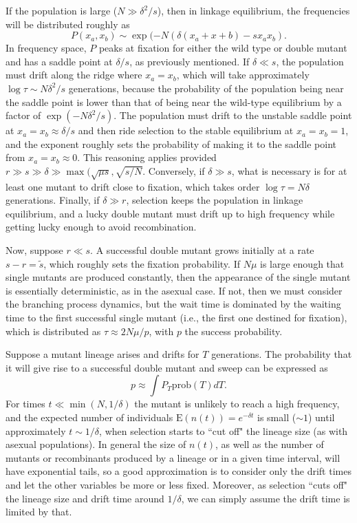\documentclass[10pt]{revtex4}
\begin{document}
If the population is large ($N \gg \delta^2/s$), then in linkage equilibrium, the frequencies will be distributed roughly as
\begin{equation}
P(x_a,x_b) \sim \exp(-N(\delta(x_a+x+b) - sx_ax_b).
\end{equation}
In frequency space, $P$ peaks at fixation for either the wild type or double mutant and has a saddle point at $\delta/s$, as previously mentioned.
If $\delta \ll s$, the population must drift along the ridge where $x_a = x_b$, which will take approximately $\log \tau \sim N\delta^2/s$ generations, because the probability of the population being near the saddle point is lower than that of being near the wild-type equilibrium by a factor of $\exp (-N\delta^2/s)$. 
The population must drift to the unstable saddle point at $x_a = x_b \approx \delta/s$ and then ride selection to the stable equilibrium at $x_a = x_b = 1$, and the exponent roughly sets the probability of making it to the saddle point from $x_a = x_b \approx 0$.
This reasoning applies provided $r \gg s \gg \delta \gg \max (\sqrt{\mu s},\sqrt{s/N}$.
Conversely, if $\delta \gg s$, what is necessary is for at least one mutant to drift close to fixation, which takes order $\log \tau = N\delta$ generations.
Finally, if $\delta \gg r$, selection keeps the population in linkage equilibrium, and a lucky double mutant must drift up to high frequency while getting lucky enough to avoid recombination.

Now, suppose $r \ll s$.
A successful double mutant grows initially at a rate $s - r = \tilde{s}$, which roughly sets the fixation probability.
If $N\mu$ is large enough that single mutants are produced constantly, then the appearance of the single mutant is essentially deterministic, as in the asexual case.
If not, then we must consider the branching process dynamics, but the wait time is dominated by the waiting time to the first successful single mutant (i.e., the first one destined for fixation), which is distributed as $\tau \approx 2N\mu/p$, with $p$ the success probability.

Suppose a mutant lineage arises and drifts for $T$ generations.
The probability that it will give rise to a successful double mutant and sweep can be expressed as
\begin{equation}
p \approx \int P_T \mathrm{prob}(T)dT.
\end{equation}
For times $t \ll \min(N, 1/\delta)$ the mutant is unlikely to reach a high frequency, and the expected number of individuals $\mathrm{E}(n(t)) = e^{-\delta t}$ is small ($\sim 1$) until approximately $t \sim 1/\delta$, when selection starts to ``cut off" the lineage size (as with asexual populations).
In general the size of $n(t)$, as well as the number of mutants or recombinants produced by a lineage or in a given time interval, will have exponential tails, so a good approximation is to consider only the drift times and let the other variables be more or less fixed.
Moreover, as selection ``cuts off" the lineage size and drift time around $1/\delta$, we can simply assume the drift time is limited by that.
\end{document}
